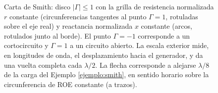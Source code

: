 \begin{figure}
    \begin{center}
    \end{center}
    \caption{Carta de Smith: disco $|\Gamma|\leqslant 1$ con la grilla de resistencia normalizada $r$ constante (circunferencias tangentes al punto $\Gamma=1$, rotuladas sobre el eje real) y reactancia normalizada $x$ constante (arcos, rotulados junto al borde). El punto $\Gamma=-1$ corresponde a un cortocircuito y $\Gamma=1$ a un circuito abierto. La escala exterior mide, en longitudes de onda, el desplazamiento hacia el generador, y da una vuelta completa cada $\lambda/2$. La flecha corresponde a alejarse $\lambda/8$ de la carga del Ejemplo \ref{ejemplo:smith}, en sentido horario sobre la circunferencia de ROE constante (a trazos).}\label{fig:carta smith}
\end{figure}

